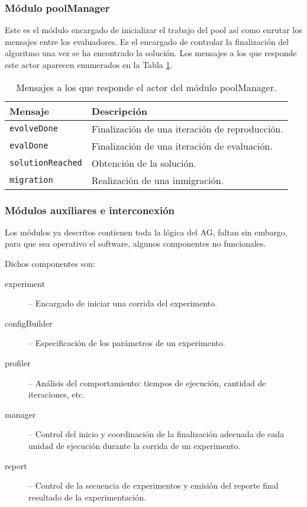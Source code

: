 \subsubsection{Módulo poolManager}

Este es el módulo encargado de inicializar el trabajo del pool así como enrutar los mensajes entre los evaluadores. Es el encargado de controlar la finalización del algoritmo una vez se ha encontrado la solución.  Los mensajes a los que responde este actor aparecen enumerados en la Tabla \ref{tb:poolManager}.

\begin{table}
  \caption{Mensajes a los que responde el actor del módulo poolManager.}\label{tb:poolManager}
  \centering
\begin{tabular}{|p{3cm}|p{7cm}|}
  \hline
   \textbf{Mensaje} &  \textbf{Descripción} \\
  \hline
  {\tt evolveDone } & Finalización de una iteración de reproducción. \\
  \hline
  {\tt evalDone} & Finalización de una iteración de evaluación. \\
  \hline
 {\tt solutionReached} & Obtención de la solución. \\
  \hline
  {\tt migration} & Realización de una inmigración. \\
  \hline
\end{tabular}
\end{table}


\subsubsection{Módulos auxiliares e interconexión}

Los módulos ya descritos contienen toda la lógica del AG, faltan sin embargo, para que sea operativo el software, algunos componentes no funcionales.

\vspace{.35cm}

\noindent  Dichos componentes son:
\begin{description}

  \item[experiment] -- Encargado de iniciar una corrida del experimento.

  \item[configBuilder] -- Especificación de los parámetros de un experimento.

  \item[profiler] -- Análisis del comportamiento: tiempos de ejecución, cantidad de iteraciones, etc.

  \item[manager] -- Control del inicio y coordinación de la finalización adecuada de cada unidad de ejecución durante la corrida de un experimento.

  \item[report] -- Control de la secuencia de experimentos y emisión del reporte final resultado de la experimentación.

\end{description}

